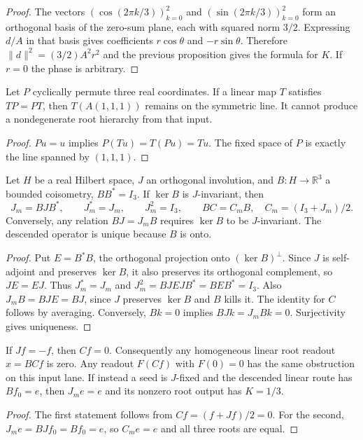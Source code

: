 \begin{proof}
The vectors $(\cos(2\pi k/3))_{k=0}^2$ and
$(\sin(2\pi k/3))_{k=0}^2$ form an orthogonal basis of the
zero-sum plane, each with squared norm $3/2$. Expressing $d/A$
in that basis gives coefficients $r\cos\theta$ and
$-r\sin\theta$. Therefore $\|d\|^2=(3/2)A^2r^2$ and the
previous proposition gives the formula for $K$. If $r=0$ the
phase is arbitrary.
\end{proof}
\begin{proposition}
\label{v480:koide-equivariant-obstruction}
Let $P$ cyclically permute three real coordinates. If a linear map
$T$ satisfies $TP=PT$, then $T(A(1,1,1))$ remains on the symmetric
line. It cannot produce a nondegenerate root hierarchy from that input.
\end{proposition}
\begin{proof}
$Pu=u$ implies $P(Tu)=T(Pu)=Tu$. The fixed space of $P$ is
exactly the line spanned by $(1,1,1)$.
\end{proof}
\begin{proposition}[descent]
\label{v480:hc-mass-descent}
Let $H$ be a real Hilbert space, $J$ an orthogonal involution, and
$B:H\to\mathbb R^3$ a bounded coisometry, $BB^*=I_3$. If
$\ker B$ is $J$-invariant, then
\[
 J_m=BJB^*,\qquad J_m^*=J_m,\qquad J_m^2=I_3,
 \qquad BC=C_mB,\quad C_m=(I_3+J_m)/2.
\]
Conversely, any relation $BJ=J_mB$ requires $\ker B$ to be
$J$-invariant. The descended operator is unique because $B$ is onto.
\end{proposition}
\begin{proof}
Put $E=B^*B$, the orthogonal projection onto $(\ker B)^\perp$.
Since $J$ is self-adjoint and preserves $\ker B$, it also preserves
its orthogonal complement, so $JE=EJ$. Thus $J_m^*=J_m$ and
$J_m^2=BJEJB^*=BEB^*=I_3$. Also
$J_mB=BJE=BJ$, since $J$ preserves $\ker B$ and $B$ kills it.
The identity for $C$ follows by averaging. Conversely,
$Bk=0$ implies $BJk=J_mBk=0$. Surjectivity gives uniqueness.
\end{proof}
\begin{proposition}
\label{v480:hc-mass-odd-obstruction}
If $Jf=-f$, then $Cf=0$. Consequently any homogeneous linear
root readout $x=BCf$ is zero. Any readout $F(Cf)$ with $F(0)=0$
has the same obstruction on this input lane. If instead a seed is
$J$-fixed and the descended linear route has $Bf_0=e$, then
$J_me=e$ and its nonzero root output has $K=1/3$.
\end{proposition}
\begin{proof}
The first statement follows from $Cf=(f+Jf)/2=0$.
For the second, $J_me=BJf_0=Bf_0=e$, so $C_me=e$ and
all three roots are equal.
\end{proof}
